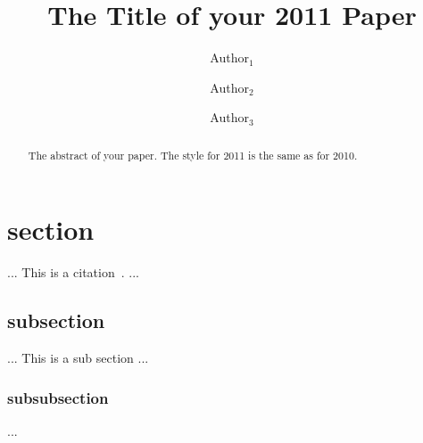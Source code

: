 \documentclass[10pt]{article}
\begin{document}
\title{The Title of your 2011 Paper}

\author{Author$_1$}

\author{Author$_2$}
\author{Author$_3$}

\date{}

\maketitle

\begin{abstract}
The abstract of your paper.  The style for 2011 is the same as for 2010.
\end{abstract}

\section{section}

... This is a citation~\cite{citedpaper}. ...

\subsection*{subsection}

... This is a sub section ...

\subsubsection*{subsubsection}

...



\end{document}
